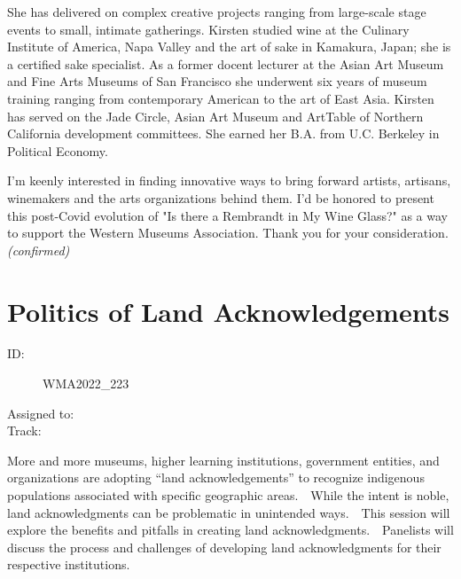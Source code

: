 \documentclass{report}
\begin{document}
She has delivered on complex creative projects ranging from large-scale stage events to small, intimate gatherings. Kirsten studied wine at the Culinary Institute of America, Napa Valley and the art of sake in Kamakura, Japan; she is a certified sake specialist. As a former docent lecturer at the Asian Art Museum and Fine Arts Museums of San Francisco she underwent six years of museum training ranging from contemporary American to the art of East Asia. Kirsten has served on the Jade Circle, Asian Art Museum and ArtTable of Northern California development committees. She earned her B.A. from U.C. Berkeley in Political Economy.

I’m keenly interested in finding innovative ways to bring forward artists, artisans, winemakers and the arts organizations behind them. I’d be honored to present this post-Covid evolution of "Is there a Rembrandt in My Wine Glass?" as a way to support the Western Museums Association. Thank you for your consideration.
                \emph{ (confirmed) }
              

              

              

              
        
          \newpage
          \section{ Politics of Land Acknowledgements }
            \begin{description}
              \item [ID:]
              WMA2022\_223

              \item [Assigned to:]
                \item [Track:]
              \end{description}

              More and more museums, higher learning institutions, government entities, and organizations are adopting “land acknowledgements” to recognize indigenous populations associated with specific geographic areas.  While the intent is noble, land acknowledgments can be problematic in unintended ways.  This session will explore the benefits and pitfalls in creating land acknowledgments.  Panelists will discuss the process and challenges of developing land acknowledgments for their respective institutions.
\end{document}

